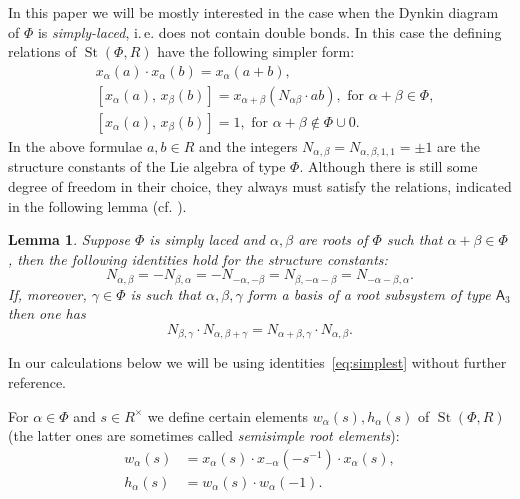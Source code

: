 \documentclass[oneside, 8pt]{amsart}
\newtheorem{lemma}{Lemma}
\theoremstyle{remark}
\theoremstyle{definition}
\numberwithin{lemma}{section}
\numberwithin{prop}{section}
\numberwithin{corollary}{section}
\numberwithin{externaltheorem}{section}
\DeclareMathOperator{\St}{St}
\newcommand{\rA}{\mathsf{A}}
\numberwithin{equation}{section}
\begin{document}
In this paper we will be mostly interested in the case when the Dynkin diagram of $\Phi$ is {\it simply-laced}, i.\,e. does not contain double bonds. In this case the defining relations of $\St(\Phi, R)$ have the following simpler form:
\begin{align}
&x_{\alpha}(a)\cdot x_{\alpha}(b)=x_{\alpha}(a+b), \tag{R1} \label{Steinberg-additivity}\\
&[x_{\alpha}(a),\,x_{\beta}(b)]=x_{\alpha+\beta}(N_{\alpha\beta} \cdot ab),\text{ for }\alpha+\beta\in\Phi, \tag{R2} \label{Chevalley-CCF1} \\
&[x_{\alpha}(a),\,x_{\beta}(b)]=1,\text{ for }\alpha+\beta\not\in\Phi\cup0. \tag{R3} \label{Chevalley-CCF2}
\end{align}
In the above formulae $a, b \in R$ and the integers $N_{\alpha, \beta} = N_{\alpha, \beta, 1, 1} = \pm 1$ are the structure constants of the Lie algebra of type $\Phi$. Although there is still some degree of freedom in their choice, they always must satisfy the relations, indicated in the following lemma (cf. \cite[\S~14]{VP}).
\begin{lemma} Suppose $\Phi$ is simply laced and $\alpha, \beta$ are roots of $\Phi$ such that $\alpha+\beta\in \Phi$, then the following identities hold for the structure constants:
\begin{equation} \label{eq:simplest} N_{\alpha, \beta} = -N_{\beta,\alpha} = - N_{-\alpha, -\beta} = N_{\beta, -\alpha-\beta} = N_{-\alpha-\beta, \alpha}. \end{equation}
If, moreover, $\gamma \in \Phi$ is such that $\alpha,\beta,\gamma$ form a basis of a root subsystem of type $\rA_3$ then one has
\begin{equation} \label{eq:cocycle} N_{\beta,\gamma} \cdot N_{\alpha, \beta+\gamma} = N_{\alpha+\beta, \gamma} \cdot N_{\alpha, \beta}. \end{equation} \end{lemma}
In our calculations below we will be using identities~\eqref{eq:simplest} without further reference.

For $\alpha\in\Phi$ and $s \in R^\times$ we define certain elements $w_\alpha(s), h_\alpha(s)$ of $\St(\Phi, R)$ (the latter ones are sometimes called {\it semisimple root elements}):
\begin{align*} w_\alpha(s) & =  x_\alpha(s) \cdot x_{-\alpha}(-s^{-1}) \cdot x_\alpha(s), \\ h_\alpha(s) & =  w_\alpha(s) \cdot w_\alpha(-1).  \end{align*}
\end{document}
